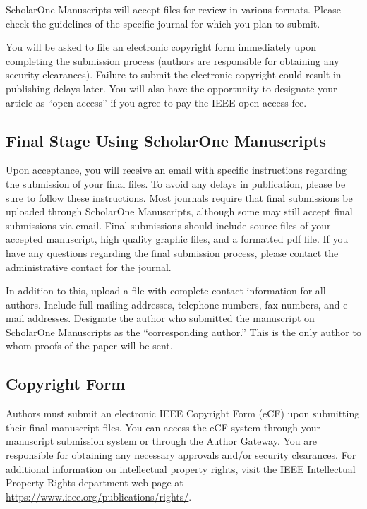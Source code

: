 \documentclass{ieeeojies}
\begin{document}
ScholarOne Manuscripts will accept files for review in various formats. 
Please check the guidelines of the specific journal for which you plan to 
submit.

You will be asked to file an electronic copyright form immediately upon 
completing the submission process (authors are responsible for obtaining any 
security clearances). Failure to submit the electronic copyright could 
result in publishing delays later. You will also have the opportunity to 
designate your article as ``open access'' if you agree to pay the IEEE open 
access fee. 

\subsection{Final Stage Using ScholarOne Manuscripts}
Upon acceptance, you will receive an email with specific instructions 
regarding the submission of your final files. To avoid any delays in 
publication, please be sure to follow these instructions. Most journals 
require that final submissions be uploaded through ScholarOne Manuscripts, 
although some may still accept final submissions via email. Final 
submissions should include source files of your accepted manuscript, high 
quality graphic files, and a formatted pdf file. If you have any questions 
regarding the final submission process, please contact the administrative 
contact for the journal. 

In addition to this, upload a file with complete contact information for all 
authors. Include full mailing addresses, telephone numbers, fax numbers, and 
e-mail addresses. Designate the author who submitted the manuscript on 
ScholarOne Manuscripts as the ``corresponding author.'' This is the only 
author to whom proofs of the paper will be sent. 

\subsection{Copyright Form}
Authors must submit an electronic IEEE Copyright Form (eCF) upon submitting 
their final manuscript files. You can access the eCF system through your 
manuscript submission system or through the Author Gateway. You are 
responsible for obtaining any necessary approvals and/or security 
clearances. For additional information on intellectual property rights, 
visit the IEEE Intellectual Property Rights department web page at 
\underline{https://www.ieee.org/publications/rights/}. 
\end{document}
